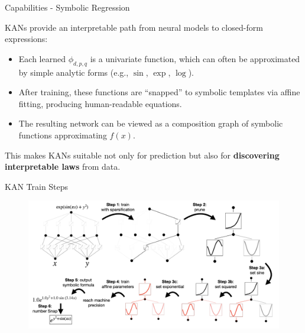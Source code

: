 \documentclass[aspectratio=169]{beamer}
\begin{document}

\begin{frame}{Capabilities - Symbolic Regression}
	
	KANs provide an interpretable path from neural models to closed-form expressions:
	
	\begin{itemize}
		\item Each learned $\phi_{d,p,q}$ is a univariate function, which can often be approximated by simple analytic forms (e.g., $\sin$, $\exp$, $\log$).
		\item After training, these functions are ``snapped'' to symbolic templates via affine fitting, producing human-readable equations.
		\item The resulting network can be viewed as a composition graph of symbolic functions approximating $f(x)$.
	\end{itemize}
	
	This makes KANs suitable not only for prediction but also for \textbf{discovering interpretable laws} from data.
	
\end{frame}


\begin{frame}{KAN Train Steps}
	
	\begin{figure}
		\centering
		\includegraphics[height=0.8\textheight]{../images/kan_training.png}
	\end{figure}
	
\end{frame}

\end{document}

